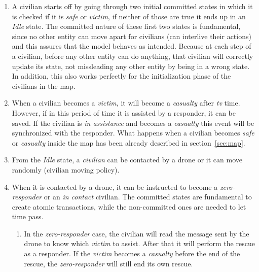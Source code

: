 \begin{enumerate}
	\item A civilian starts off by going through two initial committed states in which it is checked if it is \textit{safe} or \textit{victim}, if neither of those are true it ends up in an \textit{Idle} state. The committed nature of these first two states is fundamental, since no other entity can move apart for civilians (can interlive their actions) and this assures that the model behaves as intended. Because at each step of a civilian, before any other entity can do anything, that civilian will correctly update its state, not missleading any other entity by being in a wrong state. In addition, this also works perfectly for the initialization phase of the civilians in the map.
	
	\item When a civilian becomes a \textit{victim}, it will become a \textit{casualty} after \textit{tv} time. However, if in this period of time it is assisted by a responder, it can be saved. If the civilian is \textit{in assistance} and becomes a \textit{casualty} this event will be synchronized with the responder.\newline
	What happens when a civilian becomes \textit{safe} or \textit{casualty} inside the map has been already described in section~\ref{sec:map}.
	
	\item From the \textit{Idle} state, a \textit{civilian} can be contacted by a drone or it can move randomly (civilian moving policy).
	
	\item When it is contacted by a drone, it can be instructed to become a \textit{zero-responder} or an \textit{in contact} civilian. The committed states are fundamental to create atomic transactions, while the non-committed ones are needed to let time pass.
	
	\begin{enumerate}
		\item In the \textit{zero-responder} case, the civilian will read the message sent by the drone to know which \textit{victim} to assist. After that it will perform the rescue as a responder. If the \textit{victim} becomes a \textit{casualty} before the end of the rescue, the \textit{zero-responder} will still end its own rescue.
		

\end{enumerate}
\end{enumerate}
